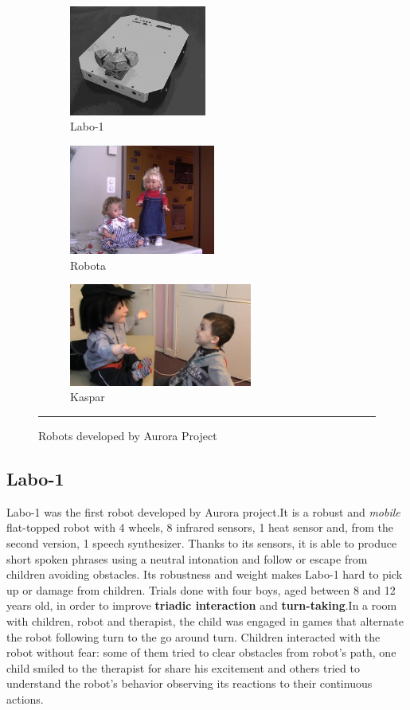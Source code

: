 \begin{figure}[h]
	\centering
	\begin{subfigure}[b]{0.3\textwidth}
		\includegraphics[width=4.5cm]{labo1}
		 \caption{Labo-1}
		 \label{fig:Labo1}
	\end{subfigure}
	\begin{subfigure}[b]{0.3\textwidth}
		\includegraphics[width=4.8cm]{robota}
		 \caption{Robota}
		 \label{fig:Robota}
	\end{subfigure}
	\begin{subfigure}[b]{0.4\textwidth}
		\includegraphics[width=6cm]{kaspar}
		 \caption{Kaspar}
		 \label{fig:Kaspar}
	\end{subfigure}
	\rule{35em}{0.5pt}
	\caption{Robots developed by Aurora Project}
	\label{fig:AuroraProjRobots}
\end{figure}

\subsection{Labo-1}
Labo-1 was the first robot developed by Aurora project\cite{werry1999applying}.It is a robust and \textit{mobile} flat-topped robot with 4 wheels, 8 infrared sensors, 1 heat sensor and, from the second version, 1 speech synthesizer. Thanks to its sensors, it is able to produce short spoken phrases using a neutral intonation and follow or escape from children avoiding obstacles. Its robustness and weight makes Labo-1 hard to pick up or damage from children. 
Trials done with four boys, aged between 8 and 12 years old, in order to improve \textbf{triadic interaction} and \textbf{turn-taking}.In a room with children, robot and therapist, the child was engaged in games that alternate the robot following turn to the go around turn. Children interacted with the robot without fear: some of them tried to clear obstacles from robot's path, one child smiled to the therapist for share his excitement and others tried to understand the robot's behavior observing its reactions to their continuous actions.
